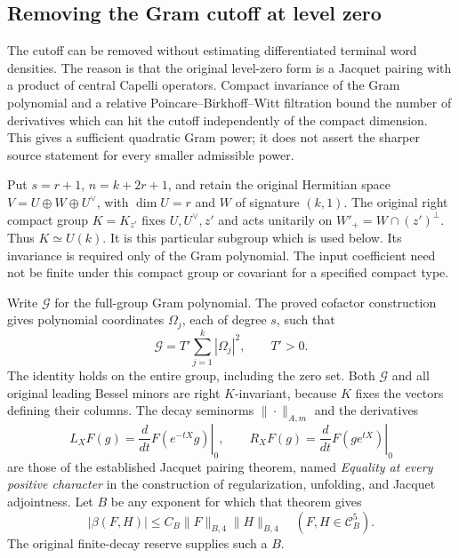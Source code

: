 \subsection{Removing the Gram cutoff at level zero}
\label{actual-gram-cutoff-pbw}

The cutoff can be removed without estimating differentiated terminal
word densities.  The reason is that the original level-zero form is a
Jacquet pairing with a product of central Capelli operators.  Compact
invariance of the Gram polynomial and a relative
Poincare--Birkhoff--Witt filtration bound the
number of derivatives which can hit the cutoff independently of the
compact dimension.  This gives a sufficient quadratic Gram power;
it does not assert the sharper source statement for every smaller
admissible power.

Put $s=r+1$, $n=k+2r+1$, and retain the original Hermitian space
$V=U\oplus W\oplus U^\vee$, with $\dim U=r$ and $W$ of
signature $(k,1)$.  The original right compact group
$K=K_{z'}$ fixes $U,U^\vee,z'$ and acts unitarily on
$W'_+=W\cap(z')^\perp$.  Thus $K\simeq U(k)$.
It is this particular subgroup which is used below.  Its invariance
is required only of the Gram polynomial.  The input coefficient
need not be finite under this compact group or covariant for a
specified compact type.

Write $\mathcal G$ for the full-group Gram polynomial.  The proved
cofactor construction gives polynomial coordinates $\Omega_j$, each
of degree $s$, such that
\begin{equation}\label{pbw-gram-squares}
 \mathcal G=T'\sum_{j=1}^k|\Omega_j|^2,\qquad T'>0.
\end{equation}
The identity holds on the entire group, including the zero set.
Both $\mathcal G$ and all original leading Bessel minors are
right $K$-invariant, because $K$ fixes the vectors defining their
columns.  The decay seminorms $\|\cdot\|_{A,m}$ and the derivatives
\[
 L_XF(g)=\left.\frac d{dt}F(e^{-tX}g)\right|_0,
 \qquad R_XF(g)=\left.\frac d{dt}F(ge^{tX})\right|_0
\]
are those of the established Jacquet pairing theorem, named
\emph{Equality at every positive character} in the construction
of regularization, unfolding, and Jacquet adjointness.  Let $B$ be
any exponent for which that theorem gives
\begin{equation}\label{pbw-pairing-bound}
 |\beta(F,H)|\le C_B\|F\|_{B,4}\|H\|_{B,4}
 \quad(F,H\in\mathcal C_B^5).
\end{equation}
The original finite-decay reserve supplies such a $B$.

